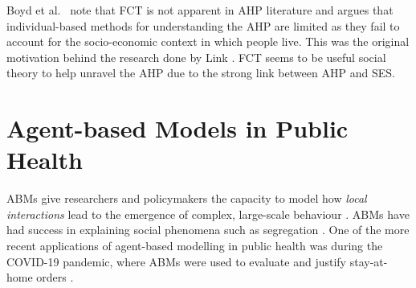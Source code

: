 Boyd et al.~\cite{Boyd2021} note that \ac{FCT} is not apparent in \ac{AHP} literature and argues that individual-based methods for understanding the \ac{AHP} are limited as they fail to account for the socio-economic context in which people live. This was the original motivation behind the research done by Link \cite{FCTorigin}. \ac{FCT} seems to be useful social theory to help unravel the \ac{AHP} due to the strong link between \ac{AHP} and \ac{SES}.





\section{Agent-based Models in Public Health}





\ac{ABM}s give researchers and policymakers the capacity to model how \textit{local interactions} lead to the emergence of complex, large-scale behaviour \cite{abmEpstein, abmGeneral}. \ac{ABM}s have had success in explaining social phenomena such as segregation \cite{schelling}.  One of the more recent applications of agent-based modelling in public health was during the COVID-19 pandemic, where \ac{ABM}s were used to evaluate and justify stay-at-home orders \cite{covidABM}. 

